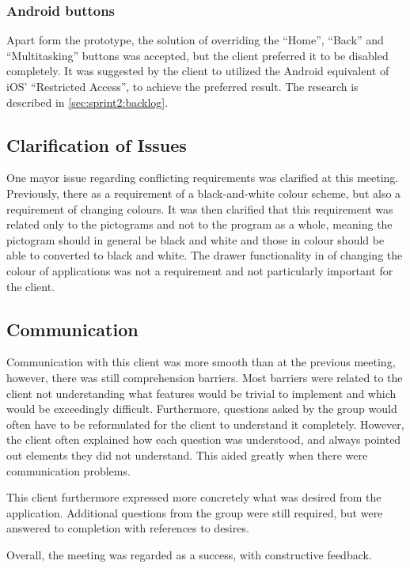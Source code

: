 \subsubsection{Android buttons}
Apart form the prototype, the solution of overriding the ``Home'', ``Back'' and ``Multitasking'' buttons was accepted, but the client preferred it to be disabled completely.
It was suggested by the client to utilized the Android equivalent of iOS' ``Restricted Access'', to achieve the preferred result.
The research is described in \cref{sec:sprint2:backlog}.

\subsection{Clarification of Issues}\label{sec:sprint2:clarification}
One mayor issue regarding conflicting requirements was clarified at this meeting.
Previously, there as a requirement of a black-and-white colour scheme, but also a requirement of changing colours.
It was then clarified that this requirement was related only to the pictograms and not to the program as a whole, meaning the pictogram should in general be black and white and those in colour should be able to converted to black and white.
The drawer functionality in \launcher of changing the colour of applications was not a requirement and not particularly important for the client.

\subsection{Communication}
Communication with this client was more smooth than at the previous meeting, however, there was still comprehension barriers.
Most barriers were related to the client not understanding what features would be trivial to implement and which would be exceedingly difficult.
Furthermore, questions asked by the group would often have to be reformulated for the client to understand it completely.
However, the client often explained how each question was understood, and always pointed out elements they did not understand.
This aided greatly when there were communication problems.

This client furthermore expressed more concretely what was desired from the application.
Additional questions from the group were still required, but were answered to completion with references to desires.

Overall, the meeting was regarded as a success, with constructive feedback.